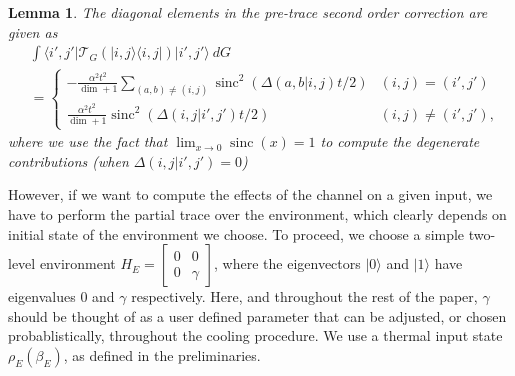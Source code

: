 \documentclass{article}
\newtheorem{lemma}[theorem]{Lemma}
\newcommand{\ket}[1]{|#1\rangle}
\newcommand{\bra}[1]{\langle #1|}
\newcommand{\ketbra}[2]{| #1\rangle\! \langle #2|}
\DeclareMathOperator{\sinc}{sinc}
\begin{document}
\begin{lemma} \label{lem:t_2_both}
    The diagonal elements in the pre-trace second order correction are given as
    \begin{align}
        &\int \bra{i', j'} \mathcal{T}_G \left( \ketbra{i, j}{i, j} \right) \ket{i', j'} ~dG \\
        &= \begin{cases}
            - \frac{\alpha^2 t^2 }{\dim + 1} \sum_{(a,b) \neq (i, j)} \sinc^2(\Delta(a,b|i,j) t / 2) & (i,j) = (i', j') \\
    \frac{\alpha^2 t^2 }{\dim + 1} \sinc^2(\Delta(i,j | i', j') t /2) & (i, j) \neq (i', j'),
        \end{cases} \label{eq:second_order_transitions_final_final}
    \end{align}
    where we use the fact that $\lim_{x \to 0} \sinc(x) = 1$ to compute the degenerate contributions (when $\Delta(i, j | i', j') = 0$)
\end{lemma}
However, if we want to compute the effects of the channel on a given input, we have to perform the partial trace over the environment, which clearly depends on initial state of the environment we choose. To proceed, we choose a simple two-level environment $H_E = \begin{bmatrix}
    0 & 0 \\ 0 & \gamma
\end{bmatrix}$, where the eigenvectors $\ket{0}$ and $\ket{1}$ have eigenvalues 0 and $\gamma$ respectively. Here, and throughout the rest of the paper, $\gamma$ should be thought of as a user defined parameter that can be adjusted, or chosen probablistically, throughout the cooling procedure. We use a thermal input state $\rho_E(\beta_E)$, as defined in the preliminaries. 
\end{document}
